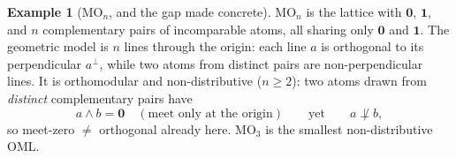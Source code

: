 \documentclass[11pt,reqno]{amsart}
\theoremstyle{plain}
\theoremstyle{definition}
\newtheorem{example}[theorem]{Example}
\theoremstyle{remark}
\begin{document}
\begin{example}[$\mathrm{MO}_n$, and the gap made concrete]\label{ex:mo}
$\mathrm{MO}_n$ is the lattice with $\mathbf 0$, $\mathbf 1$, and $n$
complementary pairs of incomparable atoms, all sharing only $\mathbf 0$
and $\mathbf 1$. The geometric model is $n$ lines through the origin: each
line $a$ is orthogonal to its perpendicular $a^\perp$, while two atoms from
distinct pairs are non-perpendicular lines. It is orthomodular and
non-distributive ($n \geq 2$): two atoms drawn from \emph{distinct}
complementary pairs have
\[
  a \wedge b = \mathbf 0 \quad(\text{meet only at the origin})
  \qquad\text{yet}\qquad a \not\perp b,
\]
so meet-zero $\neq$ orthogonal already here. $\mathrm{MO}_3$ is the smallest
non-distributive OML.

\begin{figure}[h]
\centering
{}
\end{figure}
\end{example}
\end{document}

